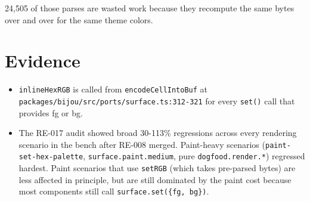 24,505 of those parses are wasted work because they recompute the same bytes over and over for the same theme colors.

\section{Evidence}\label{record-367-evidence}

\begin{itemize}
\tightlist
\item
  \texttt{i\allowbreak{}n\allowbreak{}l\allowbreak{}i\allowbreak{}n\allowbreak{}e\allowbreak{}H\allowbreak{}e\allowbreak{}x\allowbreak{}R\allowbreak{}G\allowbreak{}B} is called from \texttt{e\allowbreak{}n\allowbreak{}c\allowbreak{}o\allowbreak{}d\allowbreak{}e\allowbreak{}C\allowbreak{}e\allowbreak{}l\allowbreak{}l\allowbreak{}I\allowbreak{}n\allowbreak{}t\allowbreak{}o\allowbreak{}B\allowbreak{}u\allowbreak{}f} at \texttt{p\allowbreak{}a\allowbreak{}c\allowbreak{}k\allowbreak{}a\allowbreak{}g\allowbreak{}e\allowbreak{}s\allowbreak{}/\allowbreak{}b\allowbreak{}i\allowbreak{}j\allowbreak{}o\allowbreak{}u\allowbreak{}/\allowbreak{}s\allowbreak{}r\allowbreak{}c\allowbreak{}/\allowbreak{}p\allowbreak{}o\allowbreak{}r\allowbreak{}t\allowbreak{}s\allowbreak{}/\allowbreak{}s\allowbreak{}u\allowbreak{}r\allowbreak{}f\allowbreak{}a\allowbreak{}c\allowbreak{}e\allowbreak{}.\allowbreak{}t\allowbreak{}s\allowbreak{}:\allowbreak{}3\allowbreak{}1\allowbreak{}2\allowbreak{}-\allowbreak{}3\allowbreak{}2\allowbreak{}1} for every \texttt{s\allowbreak{}e\allowbreak{}t\allowbreak{}(\allowbreak{})} call that provides fg or bg.
\item
  The RE-017 audit showed broad 30-113\% regressions across every rendering scenario in the bench after RE-008 merged. Paint-heavy scenarios (\texttt{p\allowbreak{}a\allowbreak{}i\allowbreak{}n\allowbreak{}t\allowbreak{}-\allowbreak{}s\allowbreak{}e\allowbreak{}t\allowbreak{}-\allowbreak{}h\allowbreak{}e\allowbreak{}x\allowbreak{}-\allowbreak{}p\allowbreak{}a\allowbreak{}l\allowbreak{}e\allowbreak{}t\allowbreak{}t\allowbreak{}e}, \texttt{s\allowbreak{}u\allowbreak{}r\allowbreak{}f\allowbreak{}a\allowbreak{}c\allowbreak{}e\allowbreak{}.\allowbreak{}p\allowbreak{}a\allowbreak{}i\allowbreak{}n\allowbreak{}t\allowbreak{}.\allowbreak{}m\allowbreak{}e\allowbreak{}d\allowbreak{}i\allowbreak{}u\allowbreak{}m}, pure \texttt{d\allowbreak{}o\allowbreak{}g\allowbreak{}f\allowbreak{}o\allowbreak{}o\allowbreak{}d\allowbreak{}.\allowbreak{}r\allowbreak{}e\allowbreak{}n\allowbreak{}d\allowbreak{}e\allowbreak{}r\allowbreak{}.\allowbreak{}*}) regressed hardest. Paint scenarios that use \texttt{s\allowbreak{}e\allowbreak{}t\allowbreak{}R\allowbreak{}G\allowbreak{}B} (which takes pre-parsed bytes) are less affected in principle, but are still dominated by the paint cost because most components still call \texttt{s\allowbreak{}u\allowbreak{}r\allowbreak{}f\allowbreak{}a\allowbreak{}c\allowbreak{}e\allowbreak{}.\allowbreak{}s\allowbreak{}e\allowbreak{}t\allowbreak{}(\allowbreak{}\{\allowbreak{}f\allowbreak{}g\allowbreak{},\allowbreak{} \allowbreak{}b\allowbreak{}g\allowbreak{}\}\allowbreak{})}.

\end{itemize}
